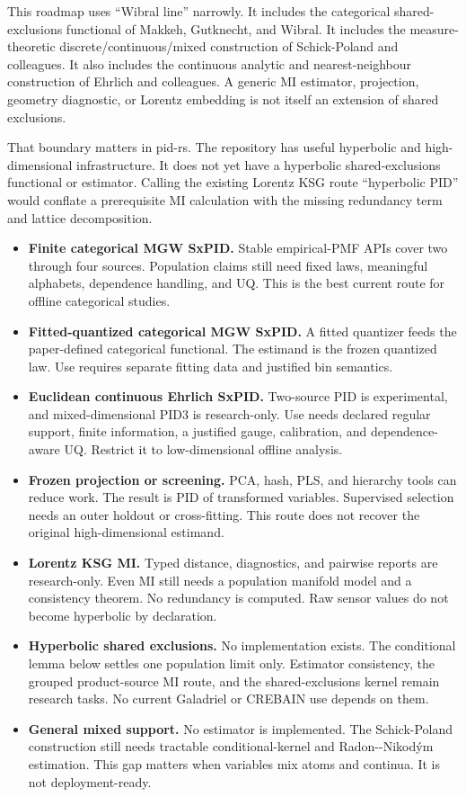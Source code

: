 \documentclass[
  11pt,
  a4paper,
]{article}
\providecommand{\tightlist}{%
  \setlength{\itemsep}{0pt}\setlength{\parskip}{0pt}}
\begin{document}
This roadmap uses ``Wibral line'' narrowly. It includes the categorical
shared-exclusions functional of Makkeh, Gutknecht, and Wibral. It
includes the measure-theoretic discrete/continuous/mixed construction of
Schick-Poland and colleagues. It also includes the continuous analytic
and nearest-neighbour construction of Ehrlich and colleagues. A generic
MI estimator, projection, geometry diagnostic, or Lorentz embedding is
not itself an extension of shared exclusions.

That boundary matters in pid-rs. The repository has useful hyperbolic
and high-dimensional infrastructure. It does not yet have a hyperbolic
shared-exclusions functional or estimator. Calling the existing Lorentz
KSG route ``hyperbolic PID'' would conflate a prerequisite MI
calculation with the missing redundancy term and lattice decomposition.

\begin{itemize}
\tightlist
\item
  \textbf{Finite categorical MGW SxPID.} Stable empirical-PMF APIs cover
  two through four sources. Population claims still need fixed laws,
  meaningful alphabets, dependence handling, and UQ. This is the best
  current route for offline categorical studies.
\item
  \textbf{Fitted-quantized categorical MGW SxPID.} A fitted quantizer
  feeds the paper-defined categorical functional. The estimand is the
  frozen quantized law. Use requires separate fitting data and justified
  bin semantics.
\item
  \textbf{Euclidean continuous Ehrlich SxPID.} Two-source PID is
  experimental, and mixed-dimensional PID3 is research-only. Use needs
  declared regular support, finite information, a justified gauge,
  calibration, and dependence-aware UQ. Restrict it to low-dimensional
  offline analysis.
\item
  \textbf{Frozen projection or screening.} PCA, hash, PLS, and hierarchy
  tools can reduce work. The result is PID of transformed variables.
  Supervised selection needs an outer holdout or cross-fitting. This
  route does not recover the original high-dimensional estimand.
\item
  \textbf{Lorentz KSG MI.} Typed distance, diagnostics, and pairwise
  reports are research-only. Even MI still needs a population manifold
  model and a consistency theorem. No redundancy is computed. Raw sensor
  values do not become hyperbolic by declaration.
\item
  \textbf{Hyperbolic shared exclusions.} No implementation exists. The
  conditional lemma below settles one population limit only. Estimator
  consistency, the grouped product-source MI route, and the
  shared-exclusions kernel remain research tasks. No current Galadriel
  or CREBAIN use depends on them.
\item
  \textbf{General mixed support.} No estimator is implemented. The
  Schick-Poland construction still needs tractable conditional-kernel
  and Radon-\/-Nikodým estimation. This gap matters when variables mix
  atoms and continua. It is not deployment-ready.
\end{itemize}
\end{document}
